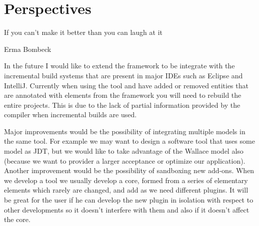 \chapter{Perspectives}\label{ch:5}

\epigraph {If you can't make it better than you can laugh at it}{Erma Bombeck}

	In the future I would like to extend the framework to be integrate with the
incremental build systems that are present in major IDEs such as Eclipse and
IntelliJ. Currently when using the tool and have added or removed entities that
are annotated with elements from the framework you will need to rebuild the
entire projects. This is due to the lack of partial information provided by the
compiler when incremental builds are used. 

	Major improvements would be the possibility of integrating multiple models in
the same tool. For example we may want to design a software tool that uses some
model as JDT, but we would like to take advantage of the Wallace model also
(because we want to provider a larger acceptance or optimize our application).\\
	Another improvement would be the possibility of sandboxing new add-ons. When
we develop a tool we usually develop a core, formed from a series of elementary
elements which rarely are changed, and add as we need different plugins. It
will be great for the user if he can develop the new plugin in isolation with respect 
to other developments so it doesn't interfere with them and also if it doesn't
affect the core.

